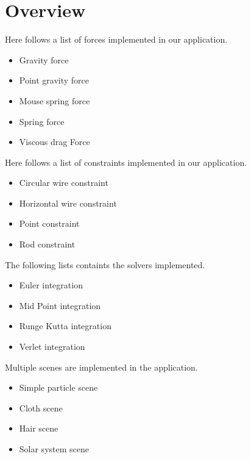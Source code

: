 \chapter{Overview}
Here follows a list of forces implemented in our application.
\begin{itemize}
  \item Gravity force
  \item Point gravity force
  \item Mouse spring force
  \item Spring force
  \item Viscous drag Force
\end{itemize}

Here follows a list of constraints implemented in our application.
\begin{itemize}
  \item Circular wire constraint
  \item Horizontal wire constraint
  \item Point constraint
  \item Rod constraint
\end{itemize}

The following lists containts the solvers implemented.
\begin{itemize}
  \item Euler integration
  \item Mid Point integration
  \item Runge Kutta integration
  \item Verlet integration
\end{itemize}

Multiple scenes are implemented in the application.
\begin{itemize}
  \item Simple particle scene
  \item Cloth scene
  \item Hair scene
  \item Solar system scene
\end{itemize}
